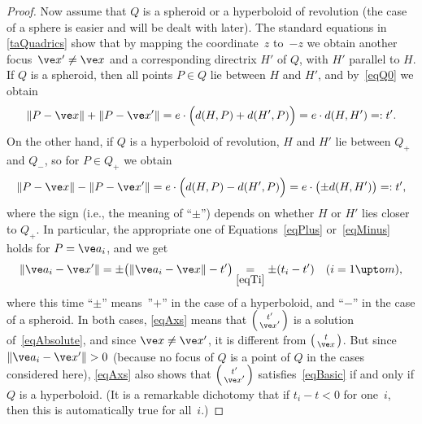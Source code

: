 \documentclass[reqno]{amsart}
\begin{document}
\begin{proof}
  Now assume that $Q$ is a spheroid or a hyperboloid of revolution
  (the case of a sphere is easier and will be dealt with later). The
  standard equations in \cref{taQuadrics} show that by mapping the
  coordinate~$z$ to~$-z$ we obtain another focus~$\ve x' \ne \ve x$
  and a corresponding directrix $H'$ of $Q$, with $H'$ parallel to
  $H$. If $Q$ is a spheroid, then all points $P \in Q$ lie between $H$
  and $H'$, and by~\eqref{eqQ0} we obtain
  \begin{equation} \label{eqPlus}%
    \lVert P - \ve x\rVert + \lVert P - \ve x'\rVert = e \cdot
    \Bigl(d(H,P) + d(H',P)\Bigr) = e \cdot d(H,H') =: t'.
  \end{equation}
  On the other hand, if $Q$ is a hyperboloid of revolution, $H$ and
  $H'$ lie between $Q_+$ and $Q_-$, so for $P \in Q_+$ we obtain
  \begin{equation} \label{eqMinus}%
    \lVert P - \ve x\rVert - \lVert P - \ve x'\rVert = e \cdot
    \Bigl(d(H,P) - d(H',P)\Bigr) = e \cdot \bigl(\pm d(H,H')\bigr) =:
    t',
  \end{equation}
  where the sign (i.e., the meaning of ``$\pm$'') depends on whether
  $H$ or $H'$ lies closer to $Q_+$. In particular, the appropriate one
  of Equations~\eqref{eqPlus} or~\eqref{eqMinus} holds for
  $P = \ve a_i$, and we get
  \begin{equation} \label{eqAxs}%
    \lVert\ve a_i - \ve x'\rVert = \pm\bigl(\lVert\ve a_i - \ve
    x\rVert - t'\bigr) \underset{\eqref{eqTi}}{=} \pm (t_i - t') \quad
    (i = 1 \upto m),
  \end{equation}
  where this time ``$\pm$'' means~''$+$'' in the case of a
  hyperboloid, and ``$-$'' in the case of a spheroid. In both cases,
  \eqref{eqAxs} means that
  $\left(\begin{smallmatrix} t' \\ \ve x'\end{smallmatrix}\right)$ is
  a solution of~\eqref{eqAbsolute}, and since $\ve x \ne \ve x'$, it
  is different from
  $\left(\begin{smallmatrix} t \\ \ve x\end{smallmatrix}\right)$. But
  since $\lVert\ve a_i - \ve x'\rVert > 0$ (because no focus of $Q$ is
  a point of $Q$ in the cases considered here), \eqref{eqAxs} also
  shows that
  $\left(\begin{smallmatrix} t' \\ \ve x'\end{smallmatrix}\right)$
  satisfies~\eqref{eqBasic} if and only if $Q$ is a hyperboloid. (It
  is a remarkable dichotomy that if $t_i - t < 0$ for one~$i$, then
  this is automatically true for all~$i$.)


\end{proof}
\end{document}
